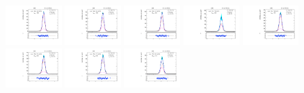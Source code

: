 \begin{figure}[htb]
\includegraphics[width=0.19\textwidth]{plots/Appendix_Recoil_Fits/ZmmMC_PF_5TeV_2G/pfu1fit_16.pdf}
\includegraphics[width=0.19\textwidth]{plots/Appendix_Recoil_Fits/ZmmMC_PF_5TeV_2G/pfu1fit_17.pdf}
\includegraphics[width=0.19\textwidth]{plots/Appendix_Recoil_Fits/ZmmMC_PF_5TeV_2G/pfu1fit_18.pdf}
\includegraphics[width=0.19\textwidth]{plots/Appendix_Recoil_Fits/ZmmMC_PF_5TeV_2G/pfu1fit_19.pdf}
\includegraphics[width=0.19\textwidth]{plots/Appendix_Recoil_Fits/ZmmMC_PF_5TeV_2G/pfu1fit_20.pdf}
\includegraphics[width=0.19\textwidth]{plots/Appendix_Recoil_Fits/ZmmMC_PF_5TeV_2G/pfu1fit_21.pdf}
\includegraphics[width=0.19\textwidth]{plots/Appendix_Recoil_Fits/ZmmMC_PF_5TeV_2G/pfu1fit_22.pdf}
\includegraphics[width=0.19\textwidth]{plots/Appendix_Recoil_Fits/ZmmMC_PF_5TeV_2G/pfu1fit_23.pdf}

\end{figure}
